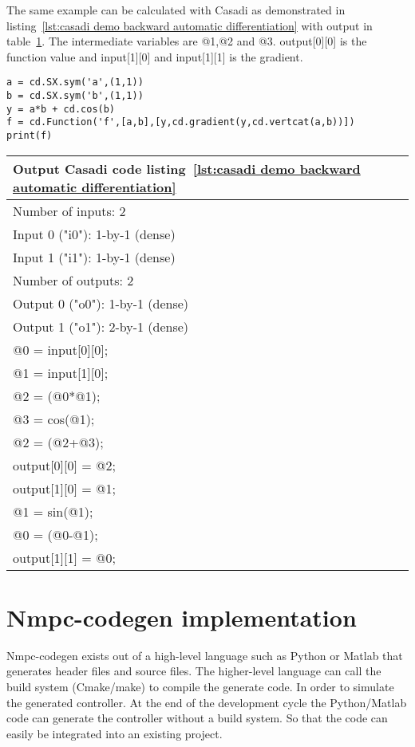 The same example can be calculated with Casadi as demonstrated in listing~\ref{lst:casadi demo backward automatic differentiation} with output in table~\ref{tbl:output casadi demo backward automatic differentiation}. The intermediate variables are @1,@2 and @3. output[0][0] is the function value and input[1][0] and input[1][1] is the gradient. 

\begin{lstlisting}[caption={Casadi example automatic backward differentiation},label={lst:casadi demo backward automatic differentiation}]
a = cd.SX.sym('a',(1,1))
b = cd.SX.sym('b',(1,1))
y = a*b + cd.cos(b)
f = cd.Function('f',[a,b],[y,cd.gradient(y,cd.vertcat(a,b))])
print(f)
\end{lstlisting}


\begin{table}
	\begin{center}
		\begin{tabular}{ |l|  }
			\hline
			Output Casadi code listing~\ref{lst:casadi demo backward automatic differentiation} \\
			\hline
			Number of inputs: 2 \\
			Input 0 ("i0"): 1-by-1 (dense) \\
			Input 1 ("i1"): 1-by-1 (dense) \\
			Number of outputs: 2 \\
			Output 0 ("o0"): 1-by-1 (dense) \\
			Output 1 ("o1"): 2-by-1 (dense) \\
			@0 = input[0][0]; \\
			@1 = input[1][0]; \\
			@2 = (@0*@1); \\
			@3 = cos(@1); \\
			@2 = (@2+@3); \\
			output[0][0] = @2; \\
			output[1][0] = @1; \\
			@1 = sin(@1); \\
			@0 = (@0-@1); \\
			output[1][1] = @0; \\
			\hline   
		\end{tabular}
		\label{tbl:output casadi demo backward automatic differentiation}
	\end{center}
\end{table}



\section{Nmpc-codegen implementation}
Nmpc-codegen exists out of a high-level language such as Python or Matlab that generates header files and source files. The higher-level language can call the build system (Cmake/make) to compile the generate code. In order to simulate the generated controller. At the end of the development cycle the Python/Matlab code can generate the controller without a build system. So that the code can easily be integrated into an existing project.

